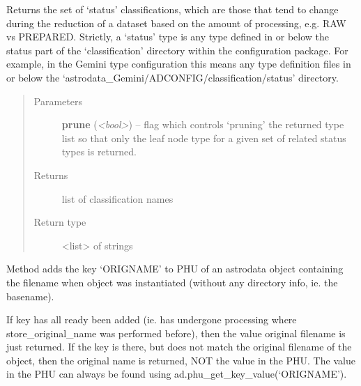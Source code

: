 \documentclass[letterpaper,10pt,english]{sphinxmanual}
\begin{document}
\begin{fulllineitems}
\begin{fulllineitems}
\end{fulllineitems}


\begin{fulllineitems}
\label{astro_class:astrodata.AstroData.AstroData.status}
Returns the set of `status' classifications, which are those that 
tend to change during the reduction of a dataset based on 
the amount of processing, e.g. RAW vs PREPARED.  Strictly, a `status' 
type is any type defined in or below the status part of the 
`classification' directory within the configuration package. For 
example, in the Gemini type configuration this means any type definition
files in or below the `astrodata\_Gemini/ADCONFIG/classification/status'
directory.
\begin{quote}\begin{description}
\item[{Parameters}] \leavevmode
\textbf{prune} (\emph{\textless{}bool\textgreater{}}) -- flag which controls `pruning' the returned type list 
so that only the leaf node type for a given set of 
related status types is returned.

\item[{Returns}] \leavevmode
list of classification names

\item[{Return type}] \leavevmode
\textless{}list\textgreater{} of strings

\end{description}\end{quote}

\end{fulllineitems}


\begin{fulllineitems}
\label{astro_class:astrodata.AstroData.AstroData.store_original_name}
Method adds the key `ORIGNAME' to PHU of an astrodata object 
containing the filename when object was instantiated (without any 
directory info, ie. the basename).

If key has all ready been added (ie. has undergone processing where
store\_original\_name was performed before), then the value original 
filename is just returned.  If the key is there, but does not match
the original filename of the object, then the original name is 
returned, NOT the value in the PHU. The value in the PHU can always be
found using ad.phu\_get\_key\_value(`ORIGNAME').


\end{fulllineitems}
\end{fulllineitems}
\end{document}
